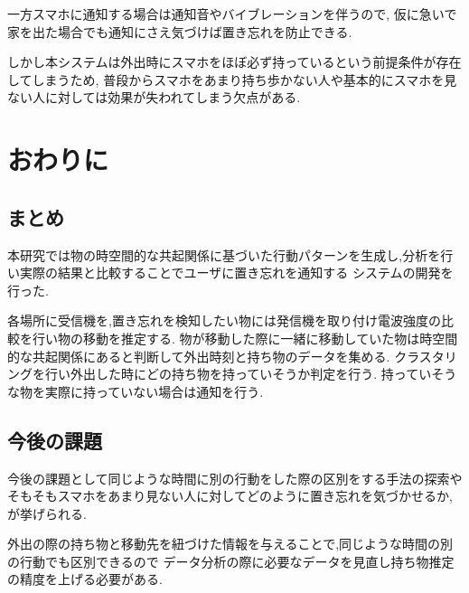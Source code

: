 \documentclass[a4j,8pt,twocolumn]{extarticle}
\begin{document}
一方スマホに通知する場合は通知音やバイブレーションを伴うので,
仮に急いで家を出た場合でも通知にさえ気づけば置き忘れを防止できる.

しかし本システムは外出時にスマホをほぼ必ず持っているという前提条件が存在してしまうため,
普段からスマホをあまり持ち歩かない人や基本的にスマホを見ない人に対しては効果が失われてしまう欠点がある.

\section{おわりに}
\subsection{まとめ}

本研究では物の時空間的な共起関係に基づいた行動パターンを生成し,分析を行い実際の結果と比較することでユーザに置き忘れを通知する
システムの開発を行った.

各場所に受信機を,置き忘れを検知したい物には発信機を取り付け電波強度の比較を行い物の移動を推定する.
物が移動した際に一緒に移動していた物は時空間的な共起関係にあると判断して外出時刻と持ち物のデータを集める.
クラスタリングを行い外出した時にどの持ち物を持っていそうか判定を行う.
持っていそうな物を実際に持っていない場合は通知を行う.


\subsection{今後の課題}
今後の課題として同じような時間に別の行動をした際の区別をする手法の探索や
そもそもスマホをあまり見ない人に対してどのように置き忘れを気づかせるか,
が挙げられる.

外出の際の持ち物と移動先を紐づけた情報を与えることで,同じような時間の別の行動でも区別できるので
データ分析の際に必要なデータを見直し持ち物推定の精度を上げる必要がある.
\end{document}
